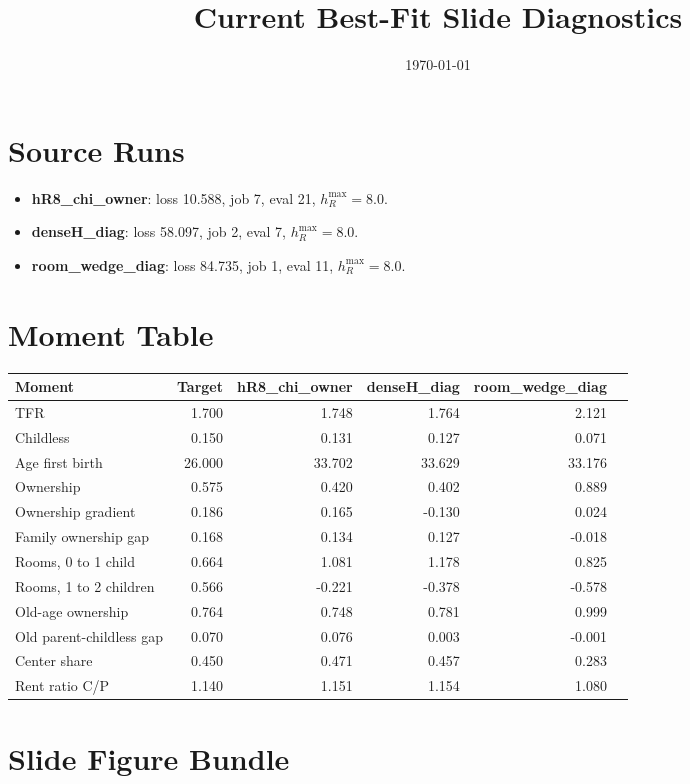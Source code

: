 \documentclass[11pt]{article}
\title{Current Best-Fit Slide Diagnostics}
\date{\today}
\begin{document}
\maketitle
\section*{Source Runs}
\begin{itemize}
\item \textbf{hR8\_chi\_owner}: loss 10.588, job 7, eval 21, $h_R^{\max}=8.0$.
\item \textbf{denseH\_diag}: loss 58.097, job 2, eval 7, $h_R^{\max}=8.0$.
\item \textbf{room\_wedge\_diag}: loss 84.735, job 1, eval 11, $h_R^{\max}=8.0$.
\end{itemize}
\section*{Moment Table}
\begin{table}[H]\centering\small
\begin{tabular}{lrrrrr}
\toprule
Moment & Target & hR8\_chi\_owner & denseH\_diag & room\_wedge\_diag \\
\midrule
TFR & 1.700 & 1.748 & 1.764 & 2.121 \\
Childless & 0.150 & 0.131 & 0.127 & 0.071 \\
Age first birth & 26.000 & 33.702 & 33.629 & 33.176 \\
Ownership & 0.575 & 0.420 & 0.402 & 0.889 \\
Ownership gradient & 0.186 & 0.165 & -0.130 & 0.024 \\
Family ownership gap & 0.168 & 0.134 & 0.127 & -0.018 \\
Rooms, 0 to 1 child & 0.664 & 1.081 & 1.178 & 0.825 \\
Rooms, 1 to 2 children & 0.566 & -0.221 & -0.378 & -0.578 \\
Old-age ownership & 0.764 & 0.748 & 0.781 & 0.999 \\
Old parent-childless gap & 0.070 & 0.076 & 0.003 & -0.001 \\
Center share & 0.450 & 0.471 & 0.457 & 0.283 \\
Rent ratio C/P & 1.140 & 1.151 & 1.154 & 1.080 \\
\bottomrule
\end{tabular}
\end{table}
\section*{Slide Figure Bundle}
\end{document}
